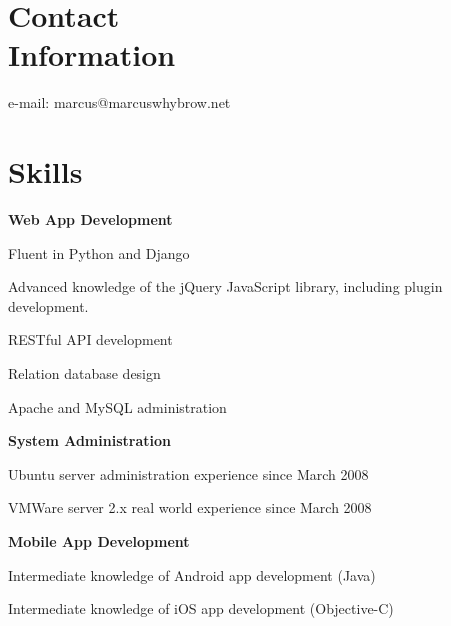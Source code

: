 \documentclass[margin,line]{resume}
\begin{document}
\begin{resume}

    \section{\mysidestyle Contact\\Information}

    e-mail: marcus@marcuswhybrow.net      \hfill   \vspace{4mm}\\\vspace{-4.5mm}%


    \section{\mysidestyle Skills}
    
    \textbf{Web App Development}\vspace{-2mm}\\%
    \begin{list2}
		\item Fluent in Python and Django
		\item Advanced knowledge of the jQuery JavaScript library, including plugin development.
		\item RESTful API development
		\item Relation database design
		\item Apache and MySQL administration
    \end{list2}
	
	\textbf{System Administration}\vspace{-2mm}\\%
	\begin{list2}
		\item Ubuntu server administration experience since March 2008
		\item VMWare server 2.x real world experience since March 2008
    \end{list2}
    
	\textbf{Mobile App Development}\vspace{-2mm}\\%
    \begin{list2}
		\item Intermediate knowledge of Android app development (Java)
		\item Intermediate knowledge of iOS app development (Objective-C)
    \end{list2}
    

\end{resume}
\end{document}
